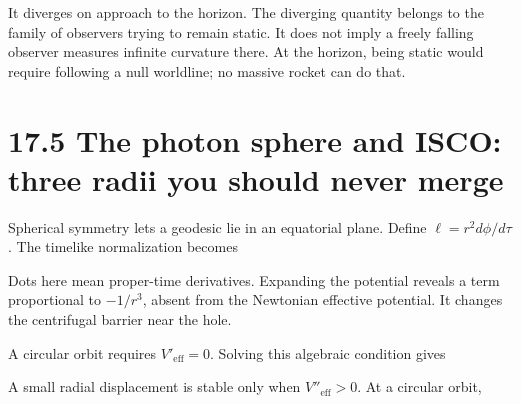 \documentclass[
  11pt,
  letterpaper,
  oneside,
  openany]{scrbook}
\begin{document}
It diverges on approach to the horizon. The diverging quantity belongs
to the family of observers trying to remain static. It does not imply a
freely falling observer measures infinite curvature there. At the
horizon, being static would require following a null worldline; no
massive rocket can do that.

\hypertarget{the-photon-sphere-and-isco-three-radii-you-should-never-merge}{%
\section{17.5 The photon sphere and ISCO: three radii you should never
merge}\label{the-photon-sphere-and-isco-three-radii-you-should-never-merge}}

Spherical symmetry lets a geodesic lie in an equatorial plane. Define
\(\ell=r^2d\phi/d\tau\). The timelike normalization becomes

\begin{center}
\begingroup
{}
\ifdim\wd\grmathbox>\linewidth
\resizebox{\linewidth}{!}{\usebox{\grmathbox}}
\else\usebox{\grmathbox}\fi
\endgroup
\end{center}

Dots here mean proper-time derivatives. Expanding the potential reveals
a term proportional to \(-1/r^3\), absent from the Newtonian effective
potential. It changes the centrifugal barrier near the hole.

A circular orbit requires \(V'_{\mathrm{eff}}=0\). Solving this
algebraic condition gives

\begin{center}
\begingroup
{}
\ifdim\wd\grmathbox>\linewidth
\resizebox{\linewidth}{!}{\usebox{\grmathbox}}
\else\usebox{\grmathbox}\fi
\endgroup
\end{center}

A small radial displacement is stable only when
\(V''_{\mathrm{eff}}>0\). At a circular orbit,

\begin{center}
\begingroup
{}
\ifdim\wd\grmathbox>\linewidth
\resizebox{\linewidth}{!}{\usebox{\grmathbox}}
\else\usebox{\grmathbox}\fi
\endgroup
\end{center}
\end{document}
